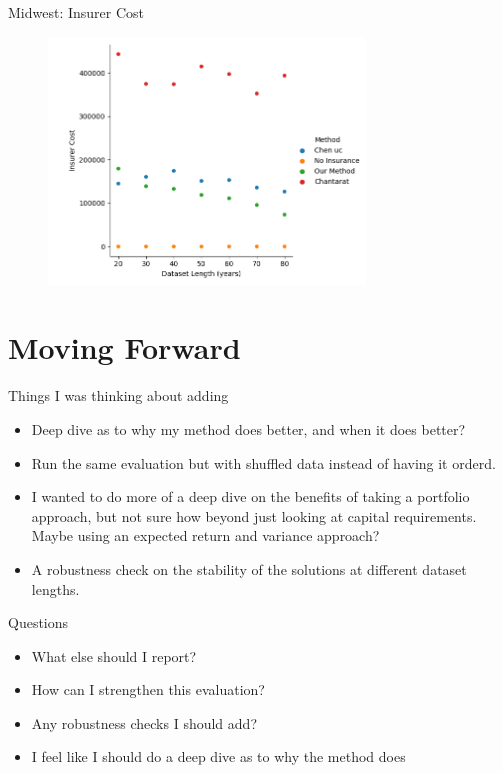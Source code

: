 \documentclass{beamer}
\begin{document}
\begin{frame}{Midwest: Insurer Cost}
    \begin{figure}
        \includegraphics[width=0.75\textwidth]{../../../output/figures/Midwest Evaluation/Midwest_Insurer Cost_Length.png}
    \end{figure}
\end{frame}


\section*{Moving Forward}
\begin{frame}{Things I was thinking about adding}
    \begin{itemize}
        \item Deep dive as to why my method does better, and when it does better?
        \item Run the same evaluation but with shuffled data instead of having it orderd. 
       \item I wanted to do more of a deep dive on the benefits of taking a portfolio approach, but not sure how beyond just looking at capital requirements. Maybe using an expected return and variance approach?
        \item A robustness check on the stability of the solutions at different dataset lengths.
    \end{itemize}
    
\end{frame}

\begin{frame}{Questions}
    \begin{itemize}
        \item What else should I report?
        \item How can I strengthen this evaluation?
       \item Any robustness checks I should add?
        \item I feel like I should do a deep dive as to why the method does
    \end{itemize}
    
\end{frame}
\end{document}
